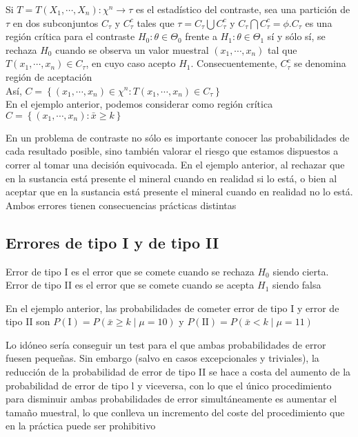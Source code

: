 Si $T=T\left(X_{1}, \cdots, X_{n}\right): \chi^{n} \rightarrow \tau$ es el estadístico del contraste, sea una partición de $\tau$ en dos subconjuntos $C_{\tau}$ y $C_{\tau}^{c}$ tales que $\tau=C_{\tau} \bigcup C_{\tau}^{c}$ y $C_{\tau} \bigcap C_{\tau}^{c}=\phi . C_{\tau}$ es una región crítica para el contraste $H_{0}: \theta \in \Theta_{0}$ frente a $H_{1}: \theta \in \Theta_{1}$ sí y sólo sí, se rechaza $H_{0}$ cuando se observa un valor muestral $\left(x_{1}, \cdots, x_{n}\right)$ tal que $T\left(x_{1}, \cdots, x_{n}\right) \in C_{\tau}$, en cuyo caso acepto $H_{1}$. Consecuentemente, $C_{\tau}^{c}$ se denomina región de aceptación\\
Así, $C=\left\{\left(x_{1}, \cdots, x_{n}\right) \in \chi^{n}: T\left(x_{1}, \cdots, x_{n}\right) \in C_{\tau}\right\}$\\
En el ejemplo anterior, podemos considerar como región crítica $C=\left\{\left(x_{1}, \cdots, x_{n}\right): \bar{x} \geq k\right\}$

En un problema de contraste no sólo es importante conocer las probabilidades de cada resultado posible, sino también valorar el riesgo que estamos dispuestos a correr al tomar una decisión equivocada. En el ejemplo anterior, al rechazar que en la sustancia está presente el mineral cuando en realidad si lo está, o bien al aceptar que en la sustancia está presente el mineral cuando en realidad no lo está. Ambos errores tienen consecuencias prácticas distintas

\subsection{Errores de tipo I y de tipo II}
Error de tipo I es el error que se comete cuando se rechaza $H_{0}$ siendo cierta. Error de tipo II es el error que se comete cuando se acepta $H_{1}$ siendo falsa

En el ejemplo anterior, las probabilidades de cometer error de tipo I y error de tipo II son $P(\mathrm{I})=P(\bar{x} \geq k \mid \mu=10)$ y $P(\mathrm{II})=P(\bar{x}<k \mid \mu=11)$

Lo idóneo sería conseguir un test para el que ambas probabilidades de error fuesen pequeñas. Sin embargo (salvo en casos excepcionales y triviales), la reducción de la probabilidad de error de tipo II se hace a costa del aumento de la probabilidad de error de tipo l y viceversa, con lo que el único procedimiento para disminuir ambas probabilidades de error simultáneamente es aumentar el tamaño muestral, lo que conlleva un incremento del coste del procedimiento que en la práctica puede ser prohibitivo

